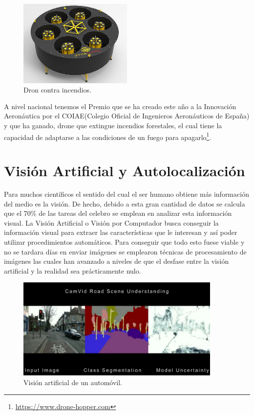 \begin{figure}[H]
	\begin{center}
		\includegraphics[width=0.5\textwidth]{imag/IMG7.jpeg}
				\caption{Dron contra incendios.} 
	\label{fig:Dron Hopper.}	
	\end{center}
\end{figure}

\hspace{1cm} A nivel nacional tenemos el Premio que se ha creado este año a la Innovación Aeronáutica por el COIAE(Colegio Oficial de Ingenieros Aeronáuticos de España) y que ha ganado, drone que extingue incendios forestales, el cual tiene la capacidad de adaptarse a las condiciones de un fuego para apagarlo\footnote{\url{https://www.drone-hopper.com}}.


\section{Visión Artificial y Autolocalización}
\hspace{1cm} Para muchos científicos el sentido del cual el ser humano obtiene más información del medio es la visión. De hecho, debido a esta gran cantidad de datos se calcula que el 70\% de las tareas del celebro se emplean en analizar esta información visual. La Visión Artificial o Visión por Computador busca conseguir la información visual para extraer las características que le interesan y así poder utilizar procedimientos automáticos. Para conseguir que todo esto fuese viable y no se tardara días en enviar imágenes se emplearon técnicas de procesamiento de imágenes las cuales han avanzado a niveles de que el desfase entre la visión artificial y la realidad sea prácticamente nulo.

\begin{figure}[H]
	\begin{center}
		\includegraphics[width=0.9\textwidth]{imag/IMG4.png}
				\caption{Visión artificial de un automóvil.}
	\label{fig:Vista artificial automoviles.}	
	\end{center}
\end{figure}

